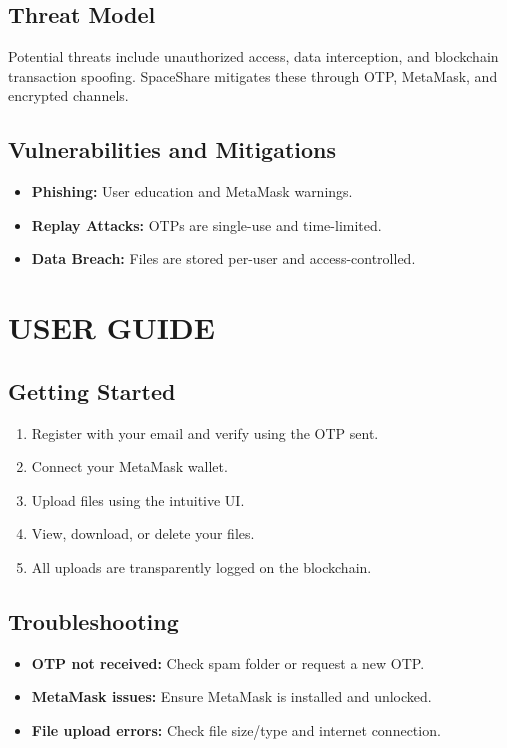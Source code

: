 \documentclass[a4paper, 12pt]{report}
\newenvironment{frontmatter}{}{}
\begin{document}
\begin{frontmatter}
\section{Threat Model}
Potential threats include unauthorized access, data interception, and blockchain transaction spoofing. SpaceShare mitigates these through OTP, MetaMask, and encrypted channels.

\section{Vulnerabilities and Mitigations}
\begin{itemize}
    \item \textbf{Phishing:} User education and MetaMask warnings.
    \item \textbf{Replay Attacks:} OTPs are single-use and time-limited.
    \item \textbf{Data Breach:} Files are stored per-user and access-controlled.
\end{itemize}

\chapter{USER GUIDE}
\section{Getting Started}
\begin{enumerate}
    \item Register with your email and verify using the OTP sent.
    \item Connect your MetaMask wallet.
    \item Upload files using the intuitive UI.
    \item View, download, or delete your files.
    \item All uploads are transparently logged on the blockchain.
\end{enumerate}

\section{Troubleshooting}
\begin{itemize}
    \item \textbf{OTP not received:} Check spam folder or request a new OTP.
    \item \textbf{MetaMask issues:} Ensure MetaMask is installed and unlocked.
    \item \textbf{File upload errors:} Check file size/type and internet connection.
\end{itemize}


\end{frontmatter}
\end{document}
